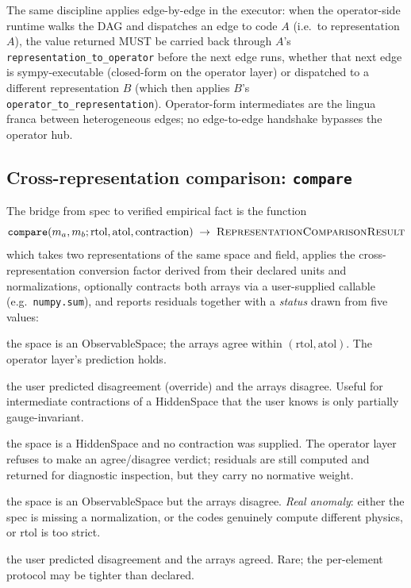 \documentclass[11pt,a4paper]{article}
\begin{document}
The same discipline applies edge-by-edge in the executor: when the
operator-side runtime walks the DAG and dispatches an edge to code $A$
(i.e.\ to representation $A$), the value returned MUST be carried back
through $A$'s \texttt{representation\_to\_operator} before the
next edge runs, whether that next edge is sympy-executable (closed-form
on the operator layer) or dispatched to a different representation $B$
(which then applies $B$'s
\texttt{operator\_to\_representation}). Operator-form intermediates
are the lingua franca between heterogeneous edges; no edge-to-edge handshake
bypasses the operator hub.

\subsection{Cross-representation comparison: \texttt{compare}}

The bridge from spec to verified empirical fact is the function
\begin{equation*}
  \texttt{compare}(m_a, m_b; \text{rtol}, \text{atol}, \text{contraction})
  \;\to\; \textsc{RepresentationComparisonResult}
\end{equation*}
which takes two representations of the same space and field, applies the cross-representation
conversion factor derived from their declared units and normalizations, optionally
contracts both arrays via a user-supplied callable (e.g.\ \texttt{numpy.sum}), and
reports residuals together with a \emph{status} drawn from five values:
\begin{description}[leftmargin=2.5em, itemsep=0.2em]
  \item[\textsc{Expected\_Agree}] the space is an ObservableSpace; the arrays agree within
        $(\text{rtol}, \text{atol})$. The operator layer's prediction holds.
  \item[\textsc{Expected\_Disagree}] the user predicted disagreement (override) and the
        arrays disagree. Useful for intermediate contractions of a HiddenSpace that the
        user knows is only partially gauge-invariant.
  \item[\textsc{Not\_Comparable}] the space is a HiddenSpace and no contraction was
        supplied. The operator layer refuses to make an agree/disagree verdict;
        residuals are still computed and returned for diagnostic inspection, but they
        carry no normative weight.
  \item[\textsc{Unexpected\_Disagree}] the space is an ObservableSpace but the arrays
        disagree. \emph{Real anomaly}: either the spec is missing a normalization, or the
        codes genuinely compute different physics, or rtol is too strict.
  \item[\textsc{Unexpected\_Agree}] the user predicted disagreement and the arrays
        agreed. Rare; the per-element protocol may be tighter than declared.
\end{description}
\end{document}
